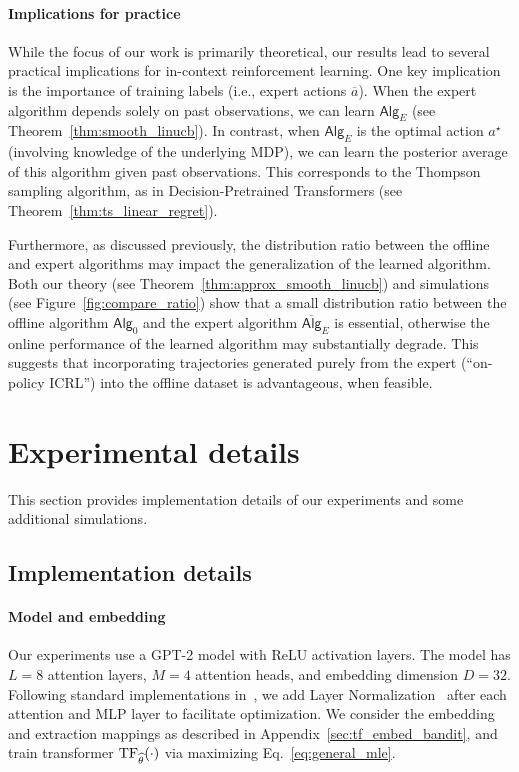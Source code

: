 \documentclass[10pt]{article}
\newcommand{\<}{\left\langle}
\renewcommand{\>}{\right\rangle}
\newcommand{\TF}{{\rm TF}}
\newcommand{\widebar}[1]{\overline{#1}}
\newcommand{\eaction}{{\widebar{a}}}
\newcommand{\sAlg}{{\mathsf{Alg}}}
\newcommand{\osAlg}{\overline{\mathsf{Alg}}}
\newcommand{\EstPar}{{\widehat{\theta}}}
\newcommand{\shortexp}{{E}}
\begin{document}
\paragraph{Implications for practice} While the focus of our work is primarily theoretical, our results lead to several practical implications for in-context reinforcement learning. One key implication is the importance of training labels (i.e., expert actions $\eaction$). When the expert algorithm depends solely on past observations, we can learn ${\sAlg}_{\shortexp}$ (see Theorem~\ref{thm:smooth_linucb}). In contrast, when ${\sAlg}_{\shortexp}$ is the optimal action $a^\star$ (involving knowledge of the underlying MDP), we can learn the posterior average of this algorithm given past observations. This corresponds to the Thompson sampling algorithm, as in Decision-Pretrained Transformers (see Theorem~\ref{thm:ts_linear_regret}).

Furthermore, as discussed previously, the distribution ratio between the offline and expert algorithms may impact the generalization of the learned algorithm. Both our theory (see Theorem~\ref{thm:approx_smooth_linucb}) and simulations (see Figure~\ref{fig:compare_ratio}) show that a small distribution ratio between the offline algorithm $\sAlg_0$ and the expert algorithm $\osAlg_{\shortexp}$ is essential, otherwise the online performance of the learned algorithm may substantially degrade. This suggests that incorporating trajectories generated purely from the expert (``on-policy ICRL'') into the offline dataset is advantageous, when feasible.


\section{Experimental details}\label{sec:exp_details}



This section provides implementation details of our experiments and some additional simulations.


\subsection{Implementation details}
\paragraph{Model and embedding}

Our experiments use a GPT-2 model \citep{radford2019language} with ReLU activation layers. The model has $L=8$ attention layers, $M=4$ attention heads, and embedding dimension $D=32$. Following standard implementations in~\cite{vaswani2017attention}, we add Layer Normalization~\citep{ba2016layer} after each attention and MLP layer to facilitate optimization. We consider the embedding and extraction mappings as described in Appendix~\ref{sec:tf_embed_bandit}, and train transformer $\TF_{\EstPar}(\cdot)$ via  maximizing Eq.~\eqref{eq:general_mle}.
\end{document}
